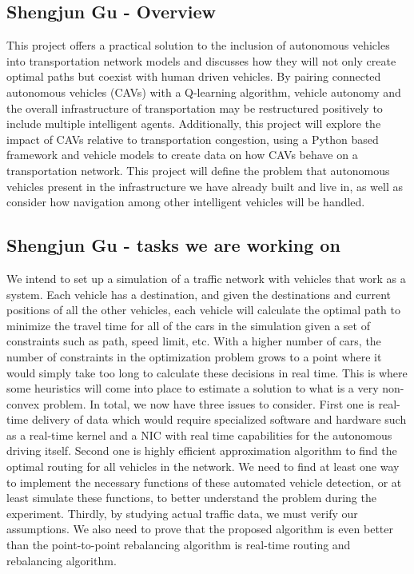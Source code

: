 \documentclass[onecolumn, draftclsnofoot,10pt, compsoc]{IEEEtran}
\begin{document}
\subsection{Shengjun Gu - Overview}
This project offers a practical solution to the inclusion of autonomous vehicles into transportation network models and discusses how they will not only create optimal paths but coexist with human driven vehicles.
By pairing connected autonomous vehicles (CAVs) with a Q-learning algorithm, vehicle autonomy and the overall infrastructure of transportation may be restructured positively to include multiple intelligent agents.
Additionally, this project will explore the impact of CAVs relative to transportation congestion, using a Python based framework and vehicle models to create data on how CAVs behave on a transportation network.
This project will define the problem that autonomous vehicles present in the infrastructure we have already built and live in, as well as consider how navigation among other intelligent vehicles will be handled.
\subsection{Shengjun Gu - tasks we are working on}
We intend to set up a simulation of a traffic network with vehicles that work as a system.
Each vehicle has a destination, and given the destinations and current positions of all the other vehicles, each vehicle will calculate the optimal path to minimize the travel time for all of the cars in the simulation given a set of constraints such as path, speed limit, etc.
With a higher number of cars, the number of constraints in the optimization problem grows to a point where it would simply take too long to calculate these decisions in real time.
This is where some heuristics will come into place to estimate a solution to what is a very non-convex problem.
In total, we now have three issues to consider.
First one is real-time delivery of data which would require specialized software and hardware such as a real-time kernel and a NIC with real time capabilities for the autonomous driving itself.
Second one is highly efficient approximation algorithm to find the optimal routing for all vehicles in the network.
We need to find at least one way to implement the necessary functions of these automated vehicle detection, or at least simulate these functions, to better understand the problem during the experiment.
Thirdly, by studying actual traffic data, we must verify our assumptions.
We also need to prove that the proposed algorithm is even better than the point-to-point rebalancing algorithm is real-time routing and rebalancing algorithm.
\end{document}
